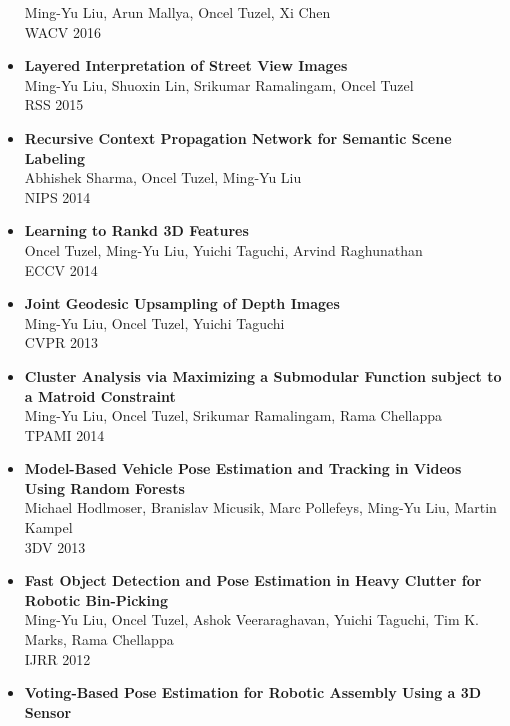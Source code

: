 \begin{itemize}
      Ming-Yu Liu, Arun Mallya, Oncel Tuzel, Xi Chen\\ WACV 2016\vspace{-2mm}
\item {\bf Layered Interpretation of Street View Images}\\
      Ming-Yu Liu, Shuoxin Lin, Srikumar Ramalingam, Oncel Tuzel\\
      RSS 2015\vspace{-2mm}
\item {\bf Recursive Context Propagation Network for Semantic Scene Labeling}\\
			Abhishek Sharma, Oncel Tuzel, Ming-Yu Liu\\ NIPS 2014\vspace{-2mm}
\item {\bf Learning to Rankd 3D Features}\\
			Oncel Tuzel, Ming-Yu Liu, Yuichi Taguchi, Arvind Raghunathan\\ ECCV 2014\vspace{-2mm}
\item {\bf Joint Geodesic Upsampling of Depth Images}\\      Ming-Yu Liu, Oncel Tuzel, Yuichi Taguchi\\
CVPR 2013\vspace{-2mm}
\item {\bf Cluster Analysis via Maximizing a Submodular Function subject to a Matroid Constraint}\\
      Ming-Yu Liu, Oncel Tuzel, Srikumar Ramalingam, Rama Chellappa\\ TPAMI 2014\vspace{-2mm}
\item {\bf Model-Based Vehicle Pose Estimation and Tracking in Videos Using Random Forests}\\
      Michael Hodlmoser, Branislav Micusik, Marc Pollefeys, Ming-Yu Liu, Martin Kampel\\ 3DV 2013\vspace{-2mm}
\item {\bf Fast Object Detection and Pose Estimation in Heavy Clutter for Robotic Bin-Picking}\\      
			Ming-Yu Liu, Oncel Tuzel, Ashok Veeraraghavan, Yuichi Taguchi, Tim K. Marks, Rama Chellappa\\ IJRR 2012\vspace{-2mm}
\item {\bf Voting-Based Pose Estimation for Robotic Assembly Using a 3D Sensor}\\

\end{itemize}
